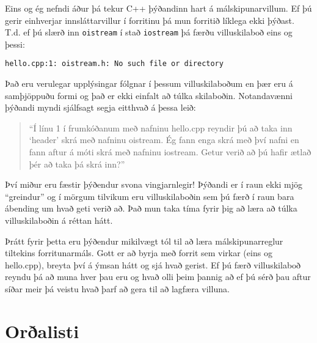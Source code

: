 Eins og ég nefndi áður þá tekur C++ þýðandinn hart á málskipunarvillum.
Ef þú gerir einhverjar innsláttarvillur í forritinu þá mun forritið líklega ekki þýðast.
T.d. ef þú slærð inn {\tt oistream} í stað {\tt iostream} þá færðu villuskilaboð eins og þessi:

\begin{verbatim}
hello.cpp:1: oistream.h: No such file or directory
\end{verbatim}
%
Það eru verulegar upplýsingar fólgnar í þessum villuskilaboðum en þær eru á samþjöppuðu formi og það er ekki einfalt að túlka skilaboðin.
Notandavænni þýðandi myndi sjálfsagt segja eitthvað á þessa leið: 

\begin{quote}
``Í línu 1 í frumkóðanum með nafninu hello.cpp reyndir þú að taka inn `header' skrá með nafninu oistream.
Ég fann enga skrá með því nafni en fann aftur á móti skrá með nafninu iostream.
Getur verið að þú hafir ætlað þér að taka þá skrá inn?''
\end{quote}

Því miður eru fæstir þýðendur svona vingjarnlegir!
Þýðandi er í raun ekki mjög ``greindur'' og í mörgum tilvikum eru villuskilaboðin sem þú færð í raun bara ábending um hvað geti verið að.
Það mun taka tíma fyrir þig að læra að túlka villuskilaboðin á réttan hátt.

Þrátt fyrir þetta eru þýðendur mikilvægt tól til að læra málskipunarreglur tiltekins forritunarmáls.
Gott er að byrja með forrit sem virkar (eins og hello.cpp), breyta því á ýmsan hátt og sjá hvað gerist.
Ef þú færð villuskilaboð reyndu þá að muna hver þau eru og hvað olli þeim þannig að ef þú sérð þau aftur síðar meir þá veistu hvað þarf að gera til að lagfæra villuna.

\section{Orðalisti}


